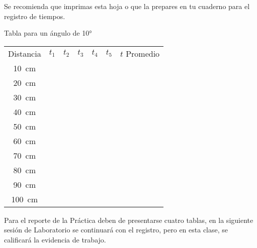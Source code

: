 \documentclass[14pt]{extarticle}
\begin{document}
Se recomienda que imprimas esta hoja o que la prepares en tu cuaderno para el registro de tiempos.
\begin{table}[H]
\centering
Tabla para un ángulo de \ang{10}

\begin{tabular}{| c | >{\centering}p{1cm} | >{\centering}p{1cm} | >{\centering}p{1cm} | >{\centering}p{1cm} | >{\centering}p{1cm} | c |} \hline
 & \multicolumn{5}{c|}{Tiempos} & \\ \hline
Distancia & $t_{1}$ & $t_{2}$ & $t_{3}$ & $t_{4}$ & $t_{5}$ & $t$ Promedio \\ \hline
\SI{10}{\centi\meter} & & & & & & \\ \hline
\SI{20}{\centi\meter} & & & & & & \\ \hline
\SI{30}{\centi\meter} & & & & & & \\ \hline
\SI{40}{\centi\meter} & & & & & & \\ \hline
\SI{50}{\centi\meter} & & & & & & \\ \hline
\SI{60}{\centi\meter} & & & & & & \\ \hline
\SI{70}{\centi\meter} & & & & & & \\ \hline
\SI{80}{\centi\meter} & & & & & & \\ \hline
\SI{90}{\centi\meter} & & & & & & \\ \hline
\SI{100}{\centi\meter} & & & & & & \\ \hline
\end{tabular}
\end{table}

Para el reporte de la Práctica deben de presentarse cuatro tablas, en la siguiente sesión de Laboratorio se continuará con el registro, pero en esta clase, se calificará la evidencia de trabajo.
\end{document}
